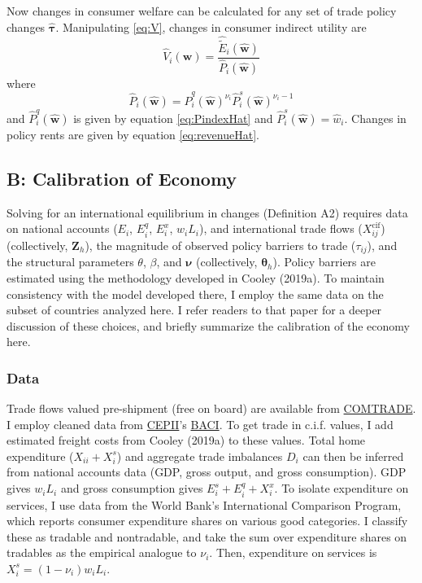 \documentclass{puthesis}
\begin{document}
Now changes in consumer welfare can be calculated for any set of trade
policy changes \(\hat{\bm{\tau}}\). Manipulating \ref{eq:V}, changes in
consumer indirect utility are \begin{equation} \label{eq:VHat}
\hat{V}_i(\bm{w}) = \frac{\hat{\tilde{E}}_i(\hat{\bm{w}})}{\hat{P}_i(\hat{\bm{w}})}
\end{equation} where \[
\hat{P}_i(\hat{\bm{w}}) = \hat{P}_i^q(\hat{\bm{w}})^{\nu_i} \hat{P}_i^s(\hat{\bm{w}})^{\nu_i - 1}
\] and \(\hat{P}_i^q(\hat{\bm{w}})\) is given by equation
\ref{eq:PindexHat} and \(\hat{P}_i^s(\hat{\bm{w}}) = \hat{w}_i\).
Changes in policy rents are given by equation \ref{eq:revenueHat}.

\subsection{B: Calibration of Economy}

Solving for an international equilibrium in changes (Definition A2)
requires data on national accounts (\(E_i\), \(E_i^q\), \(E_i^x\),
\(w_i L_i\)), and international trade flows (\(X_{ij}^{\text{cif}}\))
(collectively, \(\bm{Z}_h\)), the magnitude of observed policy barriers
to trade (\(\tau_{ij}\)), and the structural parameters \(\theta\),
\(\beta\), and \(\bm{\nu}\) (collectively, \(\bm{\theta}_h\)). Policy
barriers are estimated using the methodology developed in Cooley
(2019a). To maintain consistency with the model developed there, I
employ the same data on the subset of countries analyzed here. I refer
readers to that paper for a deeper discussion of these choices, and
briefly summarize the calibration of the economy here.

\subsubsection{Data}

Trade flows valued pre-shipment (free on board) are available from
\href{https://comtrade.un.org/db/default.aspx}{COMTRADE}. I employ
cleaned data from
\href{http://www.cepii.fr/CEPII/en/welcome.asp}{CEPII}'s
\href{http://www.cepii.fr/cepii/en/bdd_modele/presentation.asp?id=1}{BACI}.
To get trade in c.i.f. values, I add estimated freight costs from Cooley
(2019a) to these values. Total home expenditure (\(X_{ii} + X_i^s\)) and
aggregate trade imbalances \(D_i\) can then be inferred from national
accounts data (GDP, gross output, and gross consumption). GDP gives
\(w_i L_i\) and gross consumption gives \(E_i^s + E_i^q + X_i^x\). To
isolate expenditure on services, I use data from the World Bank's
International Comparison Program, which reports consumer expenditure
shares on various good categories. I classify these as tradable and
nontradable, and take the sum over expenditure shares on tradables as
the empirical analogue to \(\nu_i\). Then, expenditure on services is
\(X_i^s = (1 - \nu_i) w_i L_i\).
\end{document}
